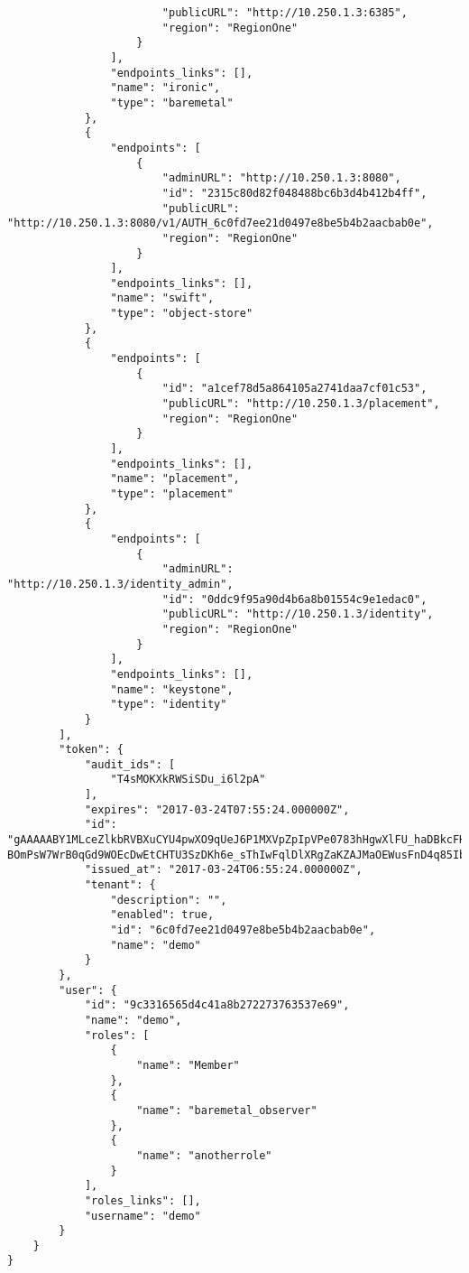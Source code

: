 \documentclass[a4paper,left=1.5cm,right=1.5cm,11pt]{article}
\begin{document}
\begin{lstlisting}
                        "publicURL": "http://10.250.1.3:6385",
                        "region": "RegionOne"
                    }
                ],
                "endpoints_links": [],
                "name": "ironic",
                "type": "baremetal"
            },
            {
                "endpoints": [
                    {
                        "adminURL": "http://10.250.1.3:8080",
                        "id": "2315c80d82f048488bc6b3d4b412b4ff",
                        "publicURL": "http://10.250.1.3:8080/v1/AUTH_6c0fd7ee21d0497e8be5b4b2aacbab0e",
                        "region": "RegionOne"
                    }
                ],
                "endpoints_links": [],
                "name": "swift",
                "type": "object-store"
            },
            {
                "endpoints": [
                    {
                        "id": "a1cef78d5a864105a2741daa7cf01c53",
                        "publicURL": "http://10.250.1.3/placement",
                        "region": "RegionOne"
                    }
                ],
                "endpoints_links": [],
                "name": "placement",
                "type": "placement"
            },
            {
                "endpoints": [
                    {
                        "adminURL": "http://10.250.1.3/identity_admin",
                        "id": "0ddc9f95a90d4b6a8b01554c9e1edac0",
                        "publicURL": "http://10.250.1.3/identity",
                        "region": "RegionOne"
                    }
                ],
                "endpoints_links": [],
                "name": "keystone",
                "type": "identity"
            }
        ],
        "token": {
            "audit_ids": [
                "T4sMOKXkRWSiSDu_i6l2pA"
            ],
            "expires": "2017-03-24T07:55:24.000000Z",
            "id": "gAAAAABY1MLceZlkbRVBXuCYU4pwXO9qUeJ6P1MXVpZpIpVPe0783hHgwXlFU_haDBkcFHln0qa4RMhvjxrQz-BOmPsW7WrB0qGd9WOEcDwEtCHTU3SzDKh6e_sThIwFqlDlXRgZaKZAJMaOEWusFnD4q85IbhhjGc_zRAYjkmuP53Sllkh3sUI",
            "issued_at": "2017-03-24T06:55:24.000000Z",
            "tenant": {
                "description": "",
                "enabled": true,
                "id": "6c0fd7ee21d0497e8be5b4b2aacbab0e",
                "name": "demo"
            }
        },
        "user": {
            "id": "9c3316565d4c41a8b272273763537e69",
            "name": "demo",
            "roles": [
                {
                    "name": "Member"
                },
                {
                    "name": "baremetal_observer"
                },
                {
                    "name": "anotherrole"
                }
            ],
            "roles_links": [],
            "username": "demo"
        }
    }
}
	\end{lstlisting}
\end{document}
